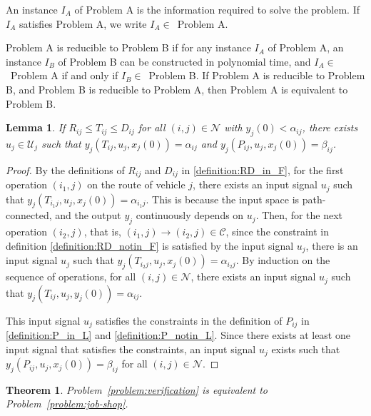 \documentclass{sig-alternate}
\newtheorem{theorem}{Theorem}
\newtheorem{lemma}{Lemma}
\begin{document}
\begin{definition}\cite{cormen_introduction_2009}
	An instance $I_A$ of Problem A is the information required to solve the problem. If $I_A$ satisfies Problem A, we write $I_A\in$~Problem A. 
	
	Problem A is reducible to Problem B if for any instance $I_A$ of Problem A, an instance $I_B$ of Problem B can be constructed in polynomial time, and $I_A\in$~Problem A if and only if $I_B\in$~Problem B. If Problem A is reducible to Problem B, and Problem B is reducible to Problem A, then Problem A is equivalent to Problem B.
\end{definition}
\begin{lemma}\label{lemma:existence_input}
	If $R_{ij}\leq T_{ij}\leq D_{ij}$ for all $(i,j)\in\mathcal{N}$ with $y_j(0)<\alpha_{ij}$, there exists $u_j\in\mathcal{U}_j$ such that $y_j(T_{ij},u_j,x_j(0))=\alpha_{ij}$ and $y_j(P_{ij},u_j,x_j(0))=\beta_{ij}$.
\end{lemma}
\begin{proof}
	By the definitions of $R_{ij}$ and $D_{ij}$ in \eqref{definition:RD_in_F}, for the first operation $(i_1,j)$ on the route of vehicle $j$, there exists an input signal ${u}_j$ such that $y_j({T}_{i_1j},{u}_j,x_j(0)) = \alpha_{i_1j}$. This is because the input space is path-connected, and the output $y_j$ continuously depends on $u_j$. Then, for the next operation $(i_2,j)$, that is, $(i_1,j)\rightarrow (i_2,j)\in\mathcal{C}$, since the constraint in definition \eqref{definition:RD_notin_F} is satisfied by the input signal $u_j$, there is an input signal $u_j$ such that $y_j(T_{i_2j},u_j,x_j(0))=\alpha_{i_2j}$. By induction on the sequence of operations, for all $(i,j)\in\mathcal{N}$, there exists an input signal $u_j$ such that $y_j(T_{ij},u_j,y_j(0))=\alpha_{ij}$.
	
	This input signal $u_j$ satisfies the constraints in the definition of $P_{ij}$ in \eqref{definition:P_in_L} and \eqref{definition:P_notin_L}. Since there exists at least one input signal that satisfies the constraints, an input signal $u_j$ exists such that $y_j(P_{ij},u_j,x_j(0))=\beta_{ij}$ for all $(i,j)\in\mathcal{N}$.
\end{proof}
\begin{theorem}\label{theorem:P1_equivalent_P3}
Problem~\ref{problem:verification} is equivalent to Problem~\ref{problem:job-shop}.
\end{theorem}
\end{document}
